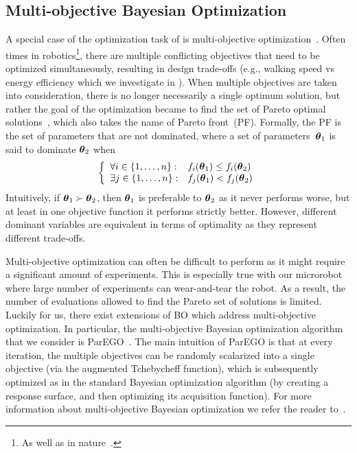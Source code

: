 \subsection{Multi-objective Bayesian Optimization}
	A special case of the optimization task of  is multi-objective optimization~\citep{Branke2008a}.
	Often times in robotics\footnote{As well as in nature~\citep{Hoyt1981}.}, there are multiple conflicting objectives that need to be optimized simultaneously, resulting in design trade-offs (e.g., walking speed vs energy efficiency which we investigate in ).  
	When multiple objectives are taken into consideration, there is no longer necessarily a single optimum solution, but rather the goal of the optimization became to find the set of Pareto optimal solutions~\citep{Pareto1906}, which also takes the name of Pareto front~(PF).
	Formally, the PF is the set of parameters that are not dominated, where a set of parameters~$\boldsymbol{\theta}_1$ is said to dominate $\boldsymbol{\theta}_2$ when 
	\begin{align}
		\left\{
		\begin{array}{l l}
		\forall i \in \{1,\dots ,n\}: &f_i(\boldsymbol{\theta}_1) \leq f_i(\boldsymbol{\theta}_2)\\
		\exists j \in \{1,\dots , n\}:  &f_j(\boldsymbol{\theta}_1) < f_j(\boldsymbol{\theta}_2)
		\end{array} \right.
	\end{align}
	Intuitively, if $\boldsymbol{\theta}_1 \succ \boldsymbol{\theta}_2$, then $\boldsymbol{\theta}_1$ is preferable to $\boldsymbol{\theta}_2$ as it never performs worse, but at least in one objective function it performs strictly better. 
	However, different dominant variables are equivalent in terms of optimality as they represent different trade-offs.
	      
	Multi-objective optimization can often be difficult to perform as it might require a significant amount of experiments.
	This is especially true with our microrobot where large number of experiments can wear-and-tear the robot.
	As a result, the number of evaluations allowed to find the Pareto set of solutions is limited. 
	Luckily for us, there exist extensions of BO which address multi-objective optimization.
	In particular, the multi-objective Bayesian optimization algorithm that we consider is ParEGO~\citep{Knowles2006}. 
	The main intuition of ParEGO is that at every iteration, the multiple objectives can be randomly scalarized into a single objective (via the augmented Tchebycheff function), which is subsequently optimized as in the standard Bayesian optimization algorithm (by creating a response surface, and then optimizing its acquisition function).
	For more information about multi-objective Bayesian optimization we refer the reader to~\citep{Wagner2010}.
    
